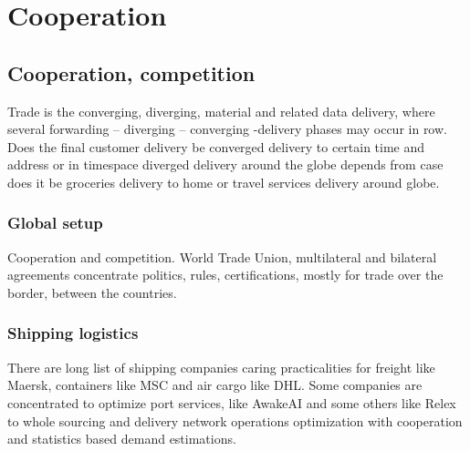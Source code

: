 %
%
%

\part{Cooperation}
\label{cooperation}

\chapter{Cooperation, competition}
\label{cooperation_competition}

Trade is the converging, diverging, material and related data delivery, where
several forwarding -- diverging -- converging -delivery phases may occur in
row. Does the final customer delivery be converged delivery to certain time
and address or in timespace diverged delivery around the globe depends from
case does it be groceries delivery to home or travel services delivery around
globe.

\section{Global setup}
\label{global_setup}
Cooperation and competition.
World Trade Union\cite{WTO}, multilateral\cite{Multilateral} and
bilateral\cite{Bilateral} agreements concentrate politics, rules,
certifications, mostly for trade over the border, between the countries.

\section{Shipping logistics}
\label{shipping_logistics}
There are long list of shipping companies caring practicalities for freight
like Maersk\cite{FreightShipping}, containers like MSC\cite{ContainerShipping}
and air cargo like DHL\cite{CargoAirlines}. Some companies are concentrated to
optimize port services, like AwakeAI\cite{AwakeAI} and some others like
Relex\cite{Relex} to whole sourcing and delivery network operations optimization
with cooperation and statistics based demand estimations.

